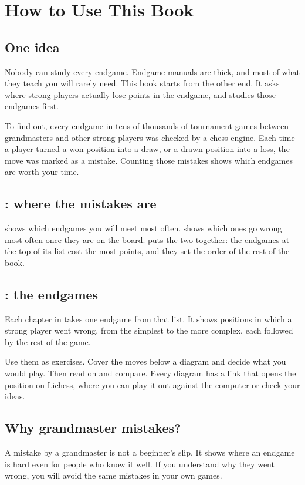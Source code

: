 \chapter{How to Use This Book}

\section*{One idea}
Nobody can study every endgame. Endgame manuals are thick, and most of what they teach you will
rarely need. This book starts from the other end. It asks where strong players actually lose
points in the endgame, and studies those endgames first.

To find out, every endgame in tens of thousands of tournament games between grandmasters and
other strong players was checked by a chess engine. Each time a player turned a won position
into a draw, or a drawn position into a loss, the move was marked as a mistake. Counting those
mistakes shows which endgames are worth your time.

\section*{: where the mistakes are}
 shows which endgames you will meet most often.  shows which ones go wrong
most often once they are on the board.  puts the two together: the endgames at the top
of its list cost the most points, and they set the order of the rest of the book.

\section*{: the endgames}
Each chapter in  takes one endgame from that list. It shows positions in which a strong
player went wrong, from the simplest to the more complex, each followed by the rest of the game.

Use them as exercises. Cover the moves below a diagram and decide what you would play. Then
read on and compare. Every diagram has a link that opens the position on Lichess, where you can
play it out against the computer or check your ideas.

\section*{Why grandmaster mistakes?}
A mistake by a grandmaster is not a beginner's slip. It shows where an endgame is hard even for
people who know it well. If you understand why they went wrong, you will avoid the same mistakes
in your own games.
